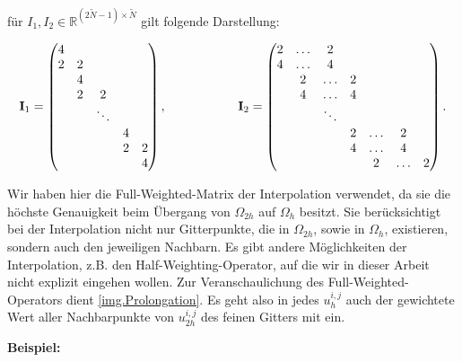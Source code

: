 für $I_{1},I_{2} \in \mathbb{R}^{(2\tilde N - 1) \times \tilde N}$ gilt folgende Darstellung:

\begin{equation}
{\textbf{I}}_{1} =
\begin{pmatrix}
4 & & & &\\
2 & 2 & & &\\
& 4 & & &\\
& 2 & 2 & &\\
& & \ddots & &\\
& & & 4 &\\
& & & 2 & 2\\
& & & & 4\\
\end{pmatrix},
\hspace{2cm}
{\textbf{I}}_{2} =
\begin{pmatrix}
2 & \hdots & 2 & & & &\\
4 & \hdots & 4 & & & &\\
& 2 & \hdots & 2 & & &\\
& 4 & \hdots & 4 & & &\\
& & \ddots & & & &\\
& & & 2 & \hdots & 2 &\\
& & & 4 & \hdots & 4 &\\
& & & & 2 & \hdots & 2\\
\end{pmatrix}.
\end{equation}

Wir haben hier die Full-Weighted-Matrix der Interpolation verwendet, da sie die höchste Genauigkeit beim Übergang von $\Omega_{2h}$ auf $\Omega_{h}$ besitzt. Sie berücksichtigt bei der Interpolation nicht nur Gitterpunkte, die in $\Omega_{2h}$, sowie in $\Omega_{h}$, existieren, sondern auch den jeweiligen Nachbarn. Es gibt andere Möglichkeiten der Interpolation, z.B. den Half-Weighting-Operator, auf die wir in dieser Arbeit nicht explizit eingehen wollen. Zur Veranschaulichung des Full-Weighted-Operators dient \autoref{img.Prolongation}. Es geht also in jedes $u^{i,j}_{h}$ auch der gewichtete Wert aller Nachbarpunkte von $u^{i,j}_{2h}$ des feinen Gitters mit ein.

\textbf{Beispiel:}

